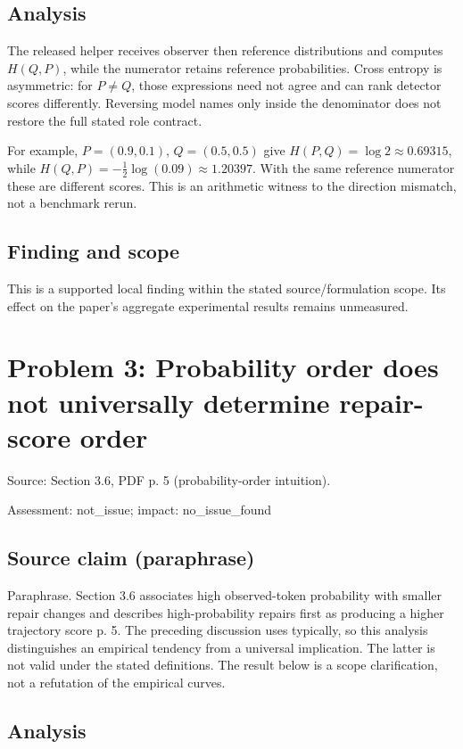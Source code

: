 \documentclass[11pt]{article}
\begin{document}
\subsection*{Analysis}

The released helper receives observer then reference distributions and computes \(H(Q,P)\), while the numerator retains reference probabilities. Cross entropy is asymmetric: for \(P\ne Q\), those expressions need not agree and can rank detector scores differently. Reversing model names only inside the denominator does not restore the full stated role contract.

For example, \(P=(0.9,0.1)\), \(Q=(0.5,0.5)\) give \(H(P,Q)=\log 2\approx0.69315\), while \(H(Q,P)=-\tfrac12\log(0.09)\approx1.20397\). With the same reference numerator these are different scores. This is an arithmetic witness to the direction mismatch, not a benchmark rerun.

\subsection*{Finding and scope}

This is a supported local finding within the stated source/formulation scope. Its effect on the paper's aggregate experimental results remains unmeasured.

\section*{Problem 3: Probability order does not universally determine repair-score order}

Source: Section 3.6, PDF p. 5 (probability-order intuition).

Assessment: not\_issue; impact: no\_issue\_found

\subsection*{Source claim (paraphrase)}

Paraphrase. Section 3.6 associates high observed-token probability with smaller repair changes and describes high-probability repairs first as producing a higher trajectory score p. 5. The preceding discussion uses typically, so this analysis distinguishes an empirical tendency from a universal implication. The latter is not valid under the stated definitions. The result below is a scope clarification, not a refutation of the empirical curves.

\subsection*{Analysis}
\end{document}
